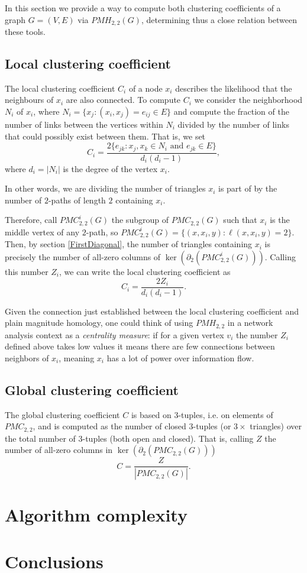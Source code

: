 \documentclass[runningheads]{llncs}
\begin{document}
In this section we provide a way to compute both clustering coefficients of a graph $G=(V,E)$ via $PMH_{2,2}(G)$, determining thus a close relation between these tools.


\subsection{Local clustering coefficient}

The local clustering coefficient $C_i$ of a node $x_i$ describes the likelihood that the neighbours of $x_i$ are also connected.
To compute $C_i$ we consider the neighborhood $N_i$ of $x_i$, where $N_i=\{x_j:(x_i,x_j)=e_{ij}\in E\}$ and compute the fraction of the number of links between the vertices within $N_i$ divided by the number of links that could possibly exist between them.
That is, we set
\[
C_i = \frac{2\{e_{jk}:x_j,x_k \in N_i \text{ and } e_{jk}\in E\}}{d_i(d_i -1)},
\]
where $d_i=|N_i|$ is the degree of the vertex $x_i$.

In other words, we are dividing the number of triangles $x_i$ is part of by the number of $2$-paths of length $2$ containing $x_i$.

Therefore, call $PMC_{2,2}^i(G)$ the subgroup of $PMC_{2,2}(G)$ such that $x_i$ is the middle vertex of any $2$-path, so $PMC_{2,2}^i(G)=\{(x,x_i,y): \ell(x,x_i,y)=2\}$.
Then, by section \ref{FirstDiagonal}, the number of triangles containing $x_i$ is precisely the number of all-zero columns of $\ker(\partial_2(PMC_{2,2}^i(G)))$.
Calling this number $Z_i$, we can write the local clustering coefficient as
\[
C_i = \frac{2 Z_i}{d_i(d_i -1)}.
\]

\begin{remark}
Given the connection just established between the local clustering coefficient and plain magnitude homology, one could think of using $PMH_{2,2}$ in a network analysis context as a \emph{centrality measure}: if for a given vertex $v_i$ the number $Z_i$ defined above takes low values it means there are few connections between neighbors of $x_i$, meaning $x_i$ has a lot of power over information flow. 
\end{remark}


\subsection{Global clustering coefficient}

The global clustering coefficient $C$ is based on $3$-tuples, i.e. on elements of $PMC_{2,2}$, and is computed as the number of closed $3$-tuples (or $3  \times$ triangles) over the total number of $3$-tuples (both open and closed).
That is, calling $Z$ the number of all-zero columns in $\ker(\partial_2(PMC_{2,2}(G)))$
\[
C = \frac{Z}{|PMC_{2,2}(G)|}.
\]


\section{Algorithm complexity}

\section{Conclusions}



\end{document}
